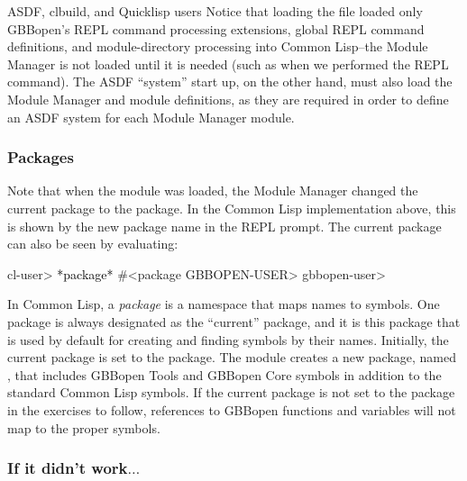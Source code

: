 \documentclass[10pt,twoside,english,pdftex]{article}
\begin{document}
\begin{notebox}{ASDF, clbuild, and Quicklisp users}
Notice that loading the  file
loaded only GBBopen's REPL command processing extensions, global REPL command
definitions, and module-directory processing into Common Lisp--the Module
Manager is not loaded until it is needed (such as when we performed the
 REPL command).  The ASDF 
``system'' start up, on the other hand, must also load the Module Manager and
module definitions, as they are required in order to define an ASDF system for
each Module Manager module.
\end{notebox}

\subsubsection*{Packages}

%
%
%
Note that when the  module was loaded, the Module Manager
changed the current package to the  package.  In the Common Lisp implementation above, this is shown by the new package name in the REPL prompt.  The current package can also be seen by evaluating:
%
\W\supp
\begin{example}
\textcolor{darkergray}{%
  cl-user> \textcolor{black}{*package*}
  #<package GBBOPEN-USER>
  gbbopen-user>}
\end{example}

In Common Lisp, a \textit{package\/} is a namespace that maps names to
symbols.  One package is always designated as the ``current'' package, and it
is this package that is used by default for creating and finding symbols by
their names.  Initially, the current package is set to the
 package.  The 
module creates a new package, named , that includes
GBBopen Tools and GBBopen Core symbols in addition to the standard Common Lisp
symbols.  If the current package is not set to the 
package in the exercises to follow, references to GBBopen functions and
variables will not map to the proper symbols.

\subsubsection*{If it didn't work$\ldots$}
\end{document}
